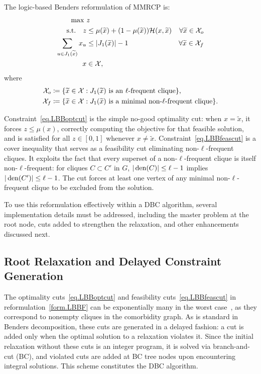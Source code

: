 The logic-based Benders reformulation of MMRCP is:
\begin{subequations}\label{form.LBBF}
\begin{align}
  \max\ & z \\
  \text{s.t.}\quad
  z &\le \mu(\widetilde x) + (1 - \mu(\widetilde x))
  \mathcal{H}(x,\widetilde{x}) & \forall \widetilde{x} \in \mathcal{X}_o
  \label{eq.LBBoptcut}\\
  \sum_{u \in J_1(\widetilde{x})} x_u &\le |J_1(\widetilde{x})| - 1
  & \forall \widetilde{x} \in \mathcal{X}_f \label{eq.LBBfeascut}\\
  x &\in \mathcal{X},
\end{align}
\end{subequations}
where
\begin{align*}
    \mathcal{X}_o &\coloneqq \{\widetilde{x} \in \mathcal{X} :
    J_1(\widetilde{x}) \text{ is an $\ell$-frequent clique}\}, \\
    \mathcal{X}_f &\coloneqq \{\widetilde{x} \in \mathcal{X} :
    J_1(\widetilde{x}) \text{ is a minimal non-$\ell$-frequent
    clique}\}.
\end{align*}

Constraint~\eqref{eq.LBBoptcut} is the simple no-good optimality cut:
when $x = \widetilde{x}$, it forces $z \le \mu(x)$, correctly
computing the objective for that feasible solution, and is satisfied
for all $z \in [0,1]$ whenever $x \ne \widetilde{x}$.
Constraint~\eqref{eq.LBBfeascut} is a cover inequality that serves as
a feasibility cut eliminating non-$\ell$-frequent cliques. It exploits
the fact that every superset of a non-$\ell$-frequent clique is itself
non-$\ell$-frequent: for cliques $C \subset C'$ in $G$,
$|\operatorname*{den}(C)| \le \ell - 1$ implies $|\operatorname*{den}(C')| \le \ell - 1$. The cut
forces at least one vertex of any minimal non-$\ell$-frequent clique
to be excluded from the solution.

To use this reformulation effectively within a DBC algorithm, several
implementation details must be addressed, including the master problem
at the root node, cuts added to strengthen the relaxation, and other
enhancements discussed next.

\subsection{Root Relaxation and Delayed Constraint
Generation}\label{sec.gamma-lbbd}

The optimality cuts~\eqref{eq.LBBoptcut} and feasibility
cuts~\eqref{eq.LBBfeascut} in reformulation~\eqref{form.LBBF} can be
exponentially many in the worst
case~\citep{MoonMoser65}, as they correspond to nonempty cliques in
the comorbidity graph. As is standard in Benders decomposition, these
cuts are generated in a delayed fashion: a cut is added only when the
optimal solution to a relaxation violates it. Since the initial
relaxation without these cuts is an integer program, it is solved via
branch-and-cut (BC), and violated cuts are added at BC tree nodes upon
encountering integral solutions. This scheme constitutes the DBC
algorithm.


